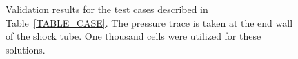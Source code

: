\begin{figure}[!h!]
	\centering
	\end{figure}
	\begin{figure}[!h!]
		\centering
	\caption{\label{FIG_VAL} Validation results for the test cases described in Table~\ref{TABLE_CASE}. The pressure trace is taken at the end wall of the shock tube. One thousand cells were utilized for these solutions.}
\end{figure}	
